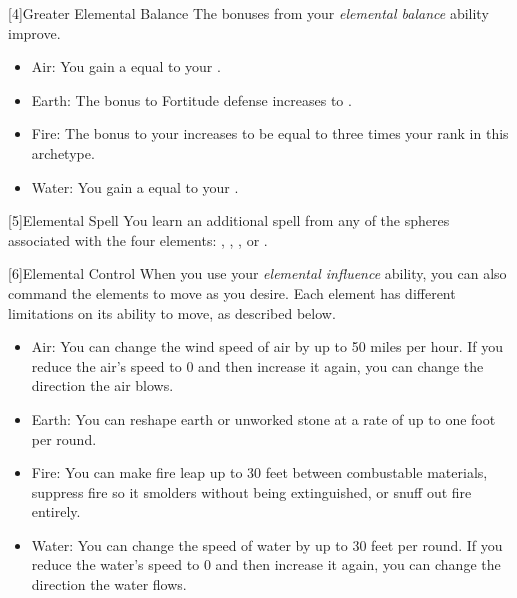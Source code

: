         [4]{Greater Elemental Balance} The bonuses from your \textit{elemental balance} ability improve.
        \begin{itemize}
            \item Air: You gain a  equal to your .
            \item Earth: The bonus to Fortitude defense increases to .
            \item Fire: The bonus to your  increases to be equal to three times your rank in this archetype.
            \item Water: You gain a  equal to your .
        \end{itemize}

        [5]{Elemental Spell} You learn an additional spell from any of the spheres associated with the four elements: , , , or .

        [6]{Elemental Control} When you use your \textit{elemental influence} ability, you can also command the elements to move as you desire.
        Each element has different limitations on its ability to move, as described below.
        \begin{itemize}
            \item Air: You can change the wind speed of air by up to 50 miles per hour.
                If you reduce the air's speed to 0 and then increase it again, you can change the direction the air blows.
            \item Earth: You can reshape earth or unworked stone at a rate of up to one foot per round.
            \item Fire: You can make fire leap up to 30 feet between combustable materials, suppress fire so it smolders without being extinguished, or snuff out fire entirely.
            \item Water: You can change the speed of water by up to 30 feet per round.
                If you reduce the water's speed to 0 and then increase it again, you can change the direction the water flows.
        \end{itemize}

